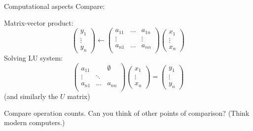 \begin{frame}{Computational aspects}
  Compare:
  \begin{multicols}{2}
    \footnotesize
    Matrix-vector product:
    \[
    \begin{pmatrix}
      y_1\\\vdots\\y_n
    \end{pmatrix}
    \leftarrow
    \begin{pmatrix}
      a_{11}&\ldots&a_{1n}\\
      \vdots& &\vdots\\
      a_{n1}&\ldots&a_{nn}\\
    \end{pmatrix}
    \begin{pmatrix}
      x_1\\\vdots\\x_n
    \end{pmatrix}
    \]
    \vfil
    \columnbreak
    Solving LU system:
    \[ 
    \begin{pmatrix}
      a_{11}&&\emptyset\\
      \vdots&\ddots &\\
      a_{n1}&\ldots&a_{nn}\\
    \end{pmatrix}
    \begin{pmatrix}
      x_1\\\vdots\\x_n
    \end{pmatrix}
    =
    \begin{pmatrix}
      y_1\\\vdots\\y_n
    \end{pmatrix}
    \]
    (and similarly the $U$ matrix)
    \vfil
    \columnbreak
  \end{multicols}
  Compare operation counts. Can you think of other points of
  comparison? (Think modern computers.)
\end{frame}

\begin{comment}
  \begin{frame}{Computational aspects}
    \begin{itemize}
    \item Factoring and solving are recursive: parallellism is not trivial
    \item (compare matrix-matrix and matrix-vector product)
    \item Complexity: $O(n^3)$ operations for factorization,\\
      $O(n^2)$ for solution
    \item Much more stable than inversion, not quite as stable as QR
    \end{itemize}
  \end{frame}
\end{comment}
